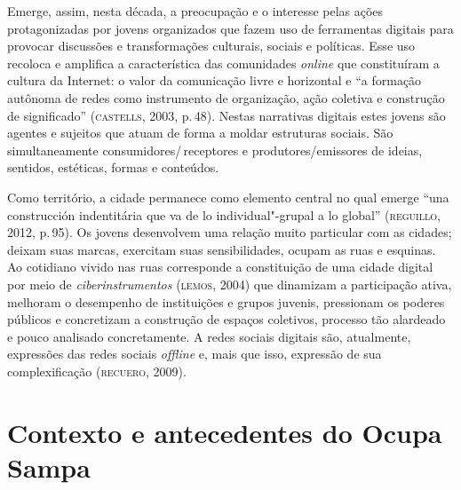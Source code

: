 Emerge, assim, nesta década, a preocupação e o interesse pelas ações
protagonizadas por jovens organizados que fazem uso de ferramentas
digitais para provocar discussões e transformações culturais, sociais e
políticas. Esse uso recoloca e amplifica a característica das
comunidades \textit{online} que constituíram a cultura da Internet: o
valor da comunicação livre e horizontal e ``a formação autônoma de redes
como instrumento de organização, ação coletiva e construção de
significado'' (\textsc{castells}, 2003, p.\,48). Nestas narrativas digitais
estes jovens são agentes e sujeitos que atuam de forma a moldar
estruturas sociais. São simultaneamente consumidores/\,receptores e
produtores/emissores de ideias, sentidos, estéticas, formas e conteúdos.

Como território, a cidade permanece como elemento central no qual emerge
``una construcción indentitária que va de lo individual"-grupal a lo
global'' (\textsc{reguillo}, 2012, p.\,95). Os jovens desenvolvem uma relação
muito particular com as cidades; deixam suas marcas, exercitam suas
sensibilidades, ocupam as ruas e esquinas. Ao cotidiano vivido nas ruas
corresponde a constituição de uma cidade digital por meio de
\textit{ciberinstrumentos} (\textsc{lemos}, 2004) que dinamizam a participação
ativa, melhoram o desempenho de instituições e grupos juvenis,
pressionam os poderes públicos e concretizam a construção de espaços
coletivos, processo tão alardeado e pouco analisado concretamente. A
redes sociais digitais são, atualmente, expressões das redes sociais
\textit{offline} e, mais que isso, expressão de sua complexificação
(\textsc{recuero}, 2009).

\section{Contexto e antecedentes do Ocupa Sampa}

